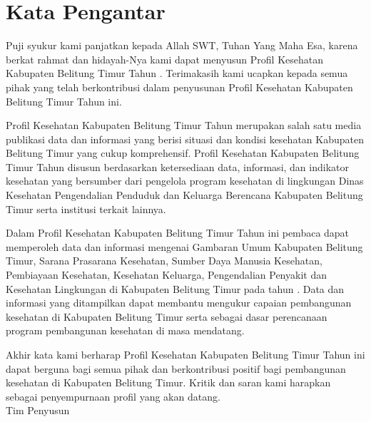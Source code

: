 {}

\section*{Kata Pengantar}
Puji syukur kami panjatkan kepada Allah SWT, Tuhan Yang Maha Esa,
karena berkat rahmat dan hidayah-Nya kami dapat menyusun Profil Kesehatan
Kabupaten Belitung Timur Tahun \tPnos{}. Terimakasih kami ucapkan kepada semua pihak
yang telah berkontribusi dalam penyusunan Profil Kesehatan Kabupaten
Belitung Timur Tahun \tPnos{} ini.

Profil Kesehatan Kabupaten Belitung Timur Tahun \tPnos{} merupakan salah
satu media publikasi data dan informasi yang berisi situasi dan kondisi
kesehatan Kabupaten Belitung Timur yang cukup komprehensif. Profil
Kesehatan Kabupaten Belitung Timur Tahun \tPnos{} disusun berdasarkan
ketersediaan data, informasi, dan indikator kesehatan yang bersumber
dari pengelola program kesehatan di lingkungan Dinas Kesehatan Pengendalian
Penduduk dan Keluarga Berencana Kabupaten Belitung Timur serta institusi
terkait lainnya.

Dalam Profil Kesehatan Kabupaten Belitung Timur Tahun \tPnos{} ini pembaca
dapat memperoleh data dan informasi mengenai Gambaran Umum Kabupaten
Belitung Timur, Sarana Prasarana Kesehatan, Sumber Daya Manusia Kesehatan,
Pembiayaan Kesehatan, Kesehatan Keluarga, Pengendalian Penyakit dan Kesehatan Lingkungan di Kabupaten Belitung Timur pada tahun
\tPnos{}. Data dan informasi yang ditampilkan dapat membantu mengukur
capaian pembangunan kesehatan di Kabupaten Belitung Timur serta sebagai
dasar perencanaan program pembangunan kesehatan di masa mendatang.

Akhir kata kami berharap Profil Kesehatan Kabupaten Belitung Timur
Tahun \tPnos{} ini dapat berguna bagi semua pihak dan berkontribusi positif
bagi pembangunan kesehatan di Kabupaten Belitung Timur. Kritik dan
saran kami harapkan sebagai penyempurnaan profil yang akan datang.\\

\vspace*{4ex}
\noindent Tim Penyusun 